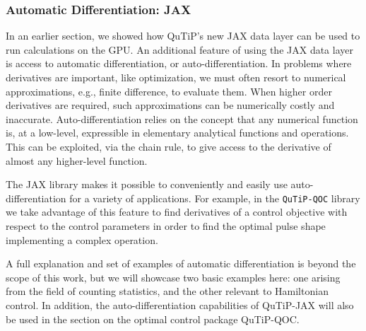\documentclass[preprint,3p,sort&compress]{elsarticle}
\begin{document}





\subsubsection{Automatic Differentiation: JAX}

In an earlier section, we showed how QuTiP's new JAX data layer can be used to run calculations on the GPU.
An additional feature of using the JAX data layer is access to automatic differentiation, or auto-differentiation.  In problems where derivatives are important, like optimization, we must often resort to numerical approximations, e.g., finite difference, to evaluate them. When higher order derivatives are required, such approximations can be numerically costly and inaccurate.  Auto-differentiation relies on the concept that any numerical function is, at a low-level, expressible in elementary analytical functions and operations. This can be exploited, via the chain rule, to give access to the derivative of almost any higher-level function.  

The JAX library makes it possible to conveniently and easily use auto-differentiation for a variety of applications. For example, in the \texttt{QuTiP-QOC} library we take advantage of this feature to find derivatives of a control objective with respect to the control parameters in order to find the optimal pulse shape implementing a complex operation.

A full explanation and set of examples of automatic differentiation is beyond the scope of this work, but we will showcase two basic examples here: one arising from the field of counting statistics, and the other relevant to Hamiltonian control.  In addition, the auto-differentiation capabilities of QuTiP-JAX will also be used in the section on the optimal control package QuTiP-QOC.
\end{document}
